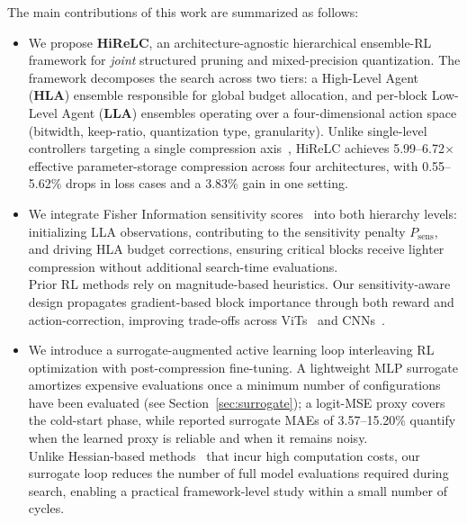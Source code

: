 \documentclass[preprint,12pt,authoryear]{elsarticle}
\begin{document}
The main contributions of this work are summarized as follows:
\begin{itemize}
    \item We propose \textbf{HiReLC}, an architecture-agnostic hierarchical ensemble-RL
 framework for \emph{joint} structured pruning and mixed-precision quantization.
 The framework decomposes the search across two tiers: a High-Level Agent
 (\textbf{HLA}) ensemble responsible for global budget allocation, and per-block
Low-Level Agent (\textbf{LLA}) ensembles operating over a four-dimensional action
space (bitwidth, keep-ratio, quantization type, granularity). Unlike single-level
controllers targeting a single compression axis~\citep{he2018amc,wang2019haq},
HiReLC achieves 5.99--6.72$\times$ effective parameter-storage compression across
four architectures, with 0.55--5.62\% drops in loss cases and a 3.83\% gain in one
setting.
  \item We integrate Fisher Information sensitivity scores~\citep{theis2018faster} into
both hierarchy levels: initializing LLA observations, contributing to the sensitivity
penalty $P_{\mathrm{sens}}$, and driving HLA budget corrections,
ensuring critical blocks receive lighter compression without additional search-time evaluations. \\
Prior RL methods rely on magnitude-based heuristics. Our sensitivity-aware design
propagates gradient-based block importance through both reward and action-correction,
improving trade-offs across ViTs~\citep{dosovitskiy2021} and
CNNs~\citep{he2016deep,sandler2018mobilenetv2}.
  \item We introduce a surrogate-augmented active learning loop interleaving RL optimization
with post-compression fine-tuning. A lightweight MLP surrogate amortizes expensive
evaluations once a minimum number of configurations have been evaluated
(see Section~\ref{sec:surrogate}); a logit-MSE proxy covers the cold-start phase,
while reported surrogate MAEs of 3.57--15.20\% quantify when the learned proxy is
reliable and when it remains noisy. \\
Unlike Hessian-based methods~\citep{dong2020hawqv2} that incur high computation costs,
our surrogate loop reduces the number of full model evaluations required during search,
enabling a practical framework-level study within a small number of cycles.
\end{itemize}

\end{document}
